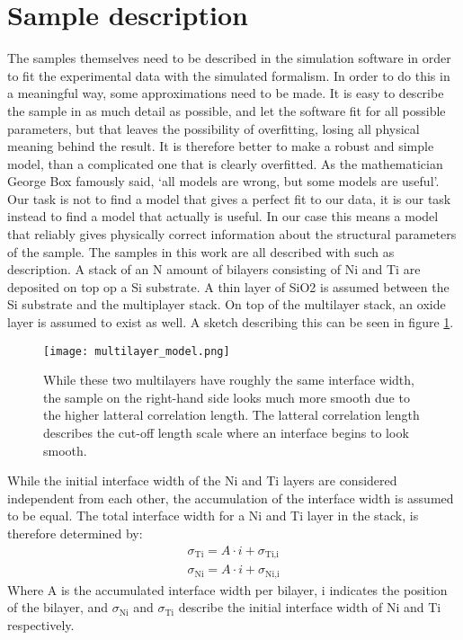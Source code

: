 \section{Sample description}
The samples themselves need to be described in the simulation software in order to fit the experimental data with the simulated formalism. In order to do this in a meaningful way, some approximations need to be made. It is easy to describe the sample in as much detail as possible, and let the software fit for all possible parameters, but that leaves the possibility of overfitting, losing all physical meaning behind the result. It is therefore better to make a robust and simple model, than a complicated one that is clearly overfitted. As the mathematician George Box famously said, ‘all models are wrong, but some models are useful’. Our task is not to find a model that gives a perfect fit to our data, it is our task instead to find a model that actually is useful.  In our case this means a model that reliably gives physically correct information about the structural parameters of the sample.
The samples in this work are all described with such as description. A stack of an N amount of bilayers consisting of Ni and Ti are deposited on top op a Si substrate. A thin layer of SiO2 is assumed between the Si substrate and the multiplayer stack. On top of the multilayer stack, an oxide layer is assumed to exist as well. A sketch describing this can be seen in figure \ref{modeldescription}.

\begin{figure}[h]
	\centering
	\texttt{[image: multilayer\_model.png]}
	\caption{While these two multilayers have roughly the same interface width, the sample on the right-hand side looks much more smooth due to the higher latteral correlation length. The latteral correlation length describes the cut-off length scale where an interface begins to look smooth.}
	\label{modeldescription}
\end{figure}

While the initial interface width of the Ni and Ti layers are considered independent from each other, the accumulation of the interface width is assumed to be equal. The total interface width for a Ni and Ti layer in the stack, is therefore determined by:
\begin{eqnarray}
	\sigma_{\textrm{Ti}} = A \cdot i + \sigma_{\textrm{Ti,i}} \\
	\sigma_{\textrm{Ni}} = A \cdot i + \sigma_{\textrm{Ni,i}}
\end{eqnarray}
Where A is the accumulated interface width per bilayer, i indicates the position of the bilayer, and $\sigma_{\textrm{Ni}}$ and $\sigma_{\textrm{Ti}}$ describe the initial interface width of Ni and Ti respectively.